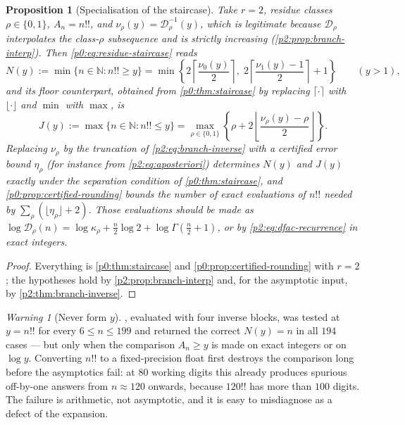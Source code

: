 \documentclass[11pt,a4paper,oneside]{book}
\theoremstyle{plain}
\newtheorem{proposition}[theorem]{Proposition}
\theoremstyle{definition}
\theoremstyle{remark}
\newtheorem{warning}[theorem]{Warning}
\newcommand{\Nat}{\mathbb{N}}
\begin{document}
\begin{proposition}[Specialisation of the staircase]
\label{p2:prop:discrete}
Take \(r=2\), residue classes \(\rho\in\{0,1\}\), \(A_n=n!!\), and
\(\nu_\rho(y)=\mathcal D_\rho^{-1}(y)\), which is legitimate because
\(\mathcal D_\rho\) interpolates the class-\(\rho\) subsequence and is strictly
increasing (\cref{p2:prop:branch-interp}).  Then
\cref{p0:eq:residue-staircase} reads
\begin{equation}
 N(y):=\min\{n\in\Nat: n!!\ge y\}
 =\min\left\{2\left\lceil\frac{\nu_0(y)}2\right\rceil,\;
   2\left\lceil\frac{\nu_1(y)-1}2\right\rceil+1\right\}
 \qquad(y>1),
 \label{p2:eq:N-exact}
\end{equation}
and its floor counterpart, obtained from \cref{p0:thm:staircase} by replacing
\(\lceil\cdot\rceil\) with \(\lfloor\cdot\rfloor\) and \(\min\) with \(\max\),
is
\begin{equation}
 J(y):=\max\{n\in\Nat: n!!\le y\}
 =\max_{\rho\in\{0,1\}}
 \left\{\rho+2\left\lfloor\frac{\nu_\rho(y)-\rho}2\right\rfloor\right\}.
 \label{p2:eq:J-exact}
\end{equation}
Replacing \(\nu_\rho\) by the truncation of \cref{p2:eq:branch-inverse} with a
certified error bound \(\eta_\rho\) (for instance from
\cref{p2:eq:aposteriori}) determines \(N(y)\) and \(J(y)\) exactly under the
separation condition of \cref{p0:thm:staircase}, and
\cref{p0:prop:certified-rounding} bounds the number of exact evaluations of
\(n!!\) needed by \(\sum_\rho(\lfloor\eta_\rho\rfloor+2)\).  Those evaluations
should be made as \(\log\mathcal D_\rho(n)=\log\kappa_\rho+\tfrac n2\log2
+\log\Gamma(\tfrac n2+1)\), or by \cref{p2:eq:dfac-recurrence} in exact
integers.
\end{proposition}

\begin{proof}
Everything is \cref{p0:thm:staircase} and \cref{p0:prop:certified-rounding}
with \(r=2\); the hypotheses hold by \cref{p2:prop:branch-interp} and, for the
asymptotic input, by \cref{p2:thm:branch-inverse}.
\end{proof}

\begin{warning}[Never form \(y\)]
\label{p2:rem:never-form-y}
, evaluated with four inverse blocks, was tested at
\(y=n!!\) for every \(6\le n\le199\) and returned the correct \(N(y)=n\) in all
\(194\) cases --- but only when the comparison \(A_n\ge y\) is made on exact
integers or on \(\log y\).  Converting \(n!!\) to a fixed-precision float first
destroys the comparison long before the asymptotics fail: at \(80\) working
digits this already produces spurious off-by-one answers from
\(n\approx120\) onwards, because \(120!!\) has more than \(100\) digits.  The
failure is arithmetic, not asymptotic, and it is easy to misdiagnose as a
defect of the expansion.
\end{warning}
\end{document}
